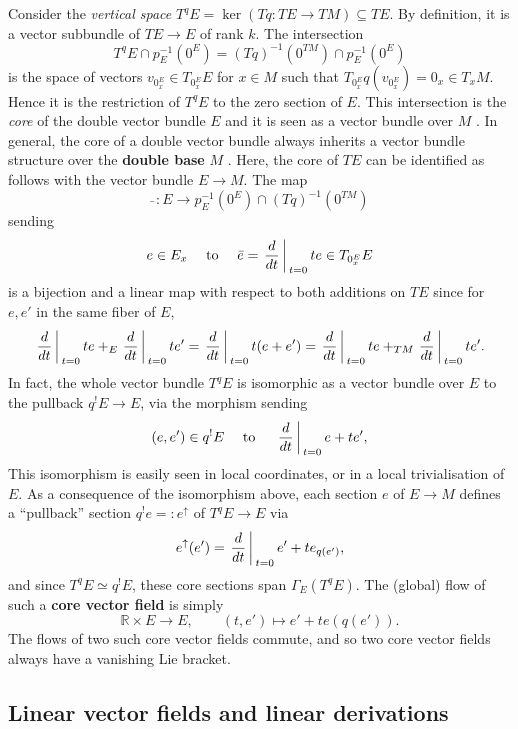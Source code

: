 \documentclass{amsart}
\theoremstyle{plain}
\newcommand{\R}{\mathbb{R}}
\newcommand{\inv}{^{-1}}
\newcommand{\an}[1]{\arrowvert_{#1}}
\begin{document}
\bigskip




Consider the \emph{vertical space} $T^qE=\ker(Tq\colon TE\to TM) \subseteq TE$. By definition, it is a vector subbundle of $TE\to E$ of rank $k$. The intersection 
\[ T^qE\cap p_E\inv(0^E)=(Tq)\inv (0^{TM})\cap p_E\inv(0^E)
\]
is the space of vectors $v_{0^E_x}\in T_{0^E_x}E$ for $x\in M$ such that 
$T_{0^E_x}q(v_{0^E_x})=0_x\in T_xM$. Hence it is the restriction of $T^qE$ to the zero section of $E$. This intersection is the \emph{core} of the double vector bundle $E$ and it is seen as a vector bundle over $M$  \cite{Pradines77}.
In general, the core of a double vector bundle always inherits a vector bundle structure over the \textbf{double base} $M$ \cite{Pradines77}.
Here, the core of $TE$ can be identified as follows with the vector bundle $E\to M$.
The map \[\bar{}\,\colon E\to p_E^{-1}(0^E)\cap
(Tq)^{-1}(0^{TM})\]
 sending \[e\in E_x \quad \text{ to } \quad \bar
e=\left.\frac{d}{dt}\right\an{t=0}te\in T_{0^E_x}E\]
is a bijection and a linear map with respect to both additions on $TE$
since for $e,e'$ in the same fiber of $E$, 
\[ \left.\frac{d}{dt}\right\an{t=0}te+_E\left.\frac{d}{dt}\right\an{t=0}te'=\left.\frac{d}{dt}\right\an{t=0}t(e+e')=\left.\frac{d}{dt}\right\an{t=0}te+_{TM}\left.\frac{d}{dt}\right\an{t=0}te'.
\] In fact, the whole vector bundle $T^qE$ is isomorphic as a vector bundle over $E$ to the pullback $q^!E\to E$, via the morphism sending 
\[ (e,e') \in q^!E \quad \text{ to } \quad \left.\frac{d}{dt}\right\an{t=0} e+te',
\]
This isomorphism is easily seen in local coordinates, or in a local trivialisation of $E$. 
As a consequence of the isomorphism above, each section $e$ of $E\to M$ defines a ``pullback'' section $ q^!e=:e^\uparrow$ of $T^qE\to E$ via 
\[ e^\uparrow (e')=\left.\frac{d}{dt}\right\an{t=0} e'+t e_{q(e')},
\]
and since $T^qE\simeq q^!E$, these core sections span $\Gamma_E(T^qE)$. The (global) flow of such a \textbf{core vector field} is simply 
\[ \R\times E\to E, \qquad (t, e')\mapsto e'+te(q(e')).
\]
The flows of two such core vector fields commute, and so two core vector fields  always have a vanishing Lie bracket.

\subsection{Linear vector fields and linear derivations}
\end{document}

